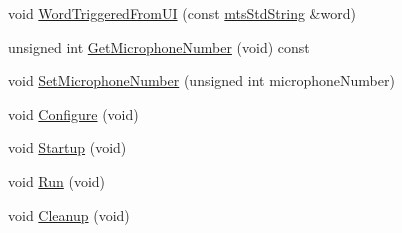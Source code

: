 \begin{DoxyCompactItemize}
\item 
void \hyperlink{classmts_c_m_u_sphinx4_a2900018c5fe6c5225c6d57ab10ec8d22}{Word\+Triggered\+From\+U\+I} (const \hyperlink{mts_generic_object_proxy_8h_adbc21bfbf98367e582bf8a263b7e711f}{mts\+Std\+String} \&word)
\item 
unsigned int \hyperlink{classmts_c_m_u_sphinx4_a9488e4f47742ce5b1b48d055e6def874}{Get\+Microphone\+Number} (void) const 
\item 
void \hyperlink{classmts_c_m_u_sphinx4_acf56f1bf512345020c8ed15639d79ade}{Set\+Microphone\+Number} (unsigned int microphone\+Number)
\item 
void \hyperlink{classmts_c_m_u_sphinx4_afaeafdc63e9389742e8a1f46d3ac0432}{Configure} (void)
\item 
void \hyperlink{classmts_c_m_u_sphinx4_aa8a33191783d7bc871cb592d0a92d66a}{Startup} (void)
\item 
void \hyperlink{classmts_c_m_u_sphinx4_aaa675bedc415146f13f5e532aa76f5ef}{Run} (void)
\item 
void \hyperlink{classmts_c_m_u_sphinx4_a657b3005af0ef03bf268c0a795aef869}{Cleanup} (void)
\end{DoxyCompactItemize}
